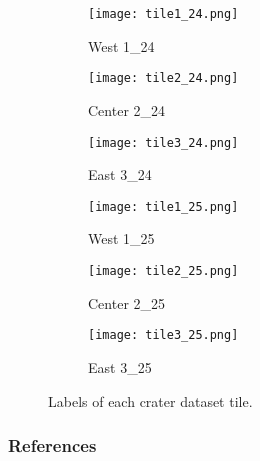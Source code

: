 \documentclass[twoside]{article}
\begin{document}
\captionsetup[subfigure]{labelformat=empty}
\begin{figure}[t]
    \centering
    \begin{subfigure}[t]{0.32\columnwidth}
        \centering
        \texttt{[image: tile1\_24.png]}
        \caption{West 1\_24}
    \end{subfigure}
    \begin{subfigure}[t]{0.32\columnwidth}
        \centering
        \texttt{[image: tile2\_24.png]}
        \caption{Center 2\_24}
    \end{subfigure}
    \begin{subfigure}[t]{0.32\columnwidth}
        \centering
        \texttt{[image: tile3\_24.png]}
        \caption{East 3\_24}
    \end{subfigure}
    
    \begin{subfigure}[t]{0.32\columnwidth}
        \centering
        \texttt{[image: tile1\_25.png]}
        \caption{West 1\_25}
    \end{subfigure}
    \begin{subfigure}[t]{0.32\columnwidth}
        \centering
        \texttt{[image: tile2\_25.png]}
        \caption{Center 2\_25}
    \end{subfigure}
    \begin{subfigure}[t]{0.32\columnwidth}
        \centering
        \texttt{[image: tile3\_25.png]}
        \caption{East 3\_25}
    \end{subfigure}
    
    \caption{Labels of each crater dataset tile.}
\end{figure}%



\vspace{-12pt}
\subsubsection*{References}
\vspace{0pt}
 
\end{document}
